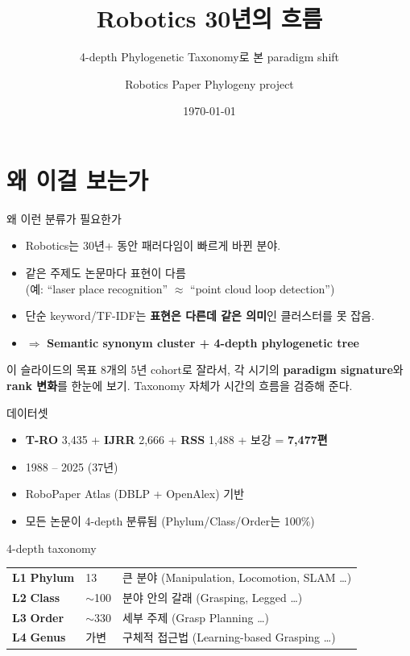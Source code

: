 \documentclass[aspectratio=169,t]{beamer}
\title[Robotics 30년]{Robotics 30년의 흐름}
\subtitle{4-depth Phylogenetic Taxonomy로 본 paradigm shift}
\author[Phylogeny]{Robotics Paper Phylogeny project}
\institute[7{,}477 papers]{T-RO · IJRR · RSS, 7,477 papers (1988--2025)}
\date{\today}
\newcommand{\hot}[1]{\textcolor{accentorange}{\textbf{#1}}}
\newcommand{\cool}[1]{\textcolor{accentblue}{\textbf{#1}}}
\newcommand{\muted}[1]{\textcolor{mutedgray}{#1}}
\begin{document}
\frame{\titlepage}

\section{왜 이걸 보는가}

\begin{frame}{왜 이런 분류가 필요한가}
\begin{itemize}
  \item Robotics는 30년+ 동안 패러다임이 빠르게 바뀐 분야.
  \item 같은 주제도 논문마다 표현이 다름 \\
        \muted{(예: ``laser place recognition'' $\approx$ ``point cloud loop detection'')}
  \item 단순 keyword/TF-IDF는 \hot{표현은 다른데 같은 의미}인 클러스터를 못 잡음.
  \item $\Rightarrow$ \cool{Semantic synonym cluster + 4-depth phylogenetic tree}
\end{itemize}
\vfill
\begin{block}{이 슬라이드의 목표}
8개의 5년 cohort로 잘라서, 각 시기의 \hot{paradigm signature}와
\hot{rank 변화}를 한눈에 보기. Taxonomy 자체가 시간의 흐름을 검증해 준다.
\end{block}
\end{frame}

\begin{frame}{데이터셋}
\begin{itemize}
  \item \cool{T-RO} 3{,}435 + \cool{IJRR} 2{,}666 + \cool{RSS} 1{,}488 + 보강 = \hot{7{,}477편}
  \item 1988 -- 2025 (37년)
  \item RoboPaper Atlas (DBLP + OpenAlex) 기반
  \item 모든 논문이 4-depth 분류됨 (Phylum/Class/Order는 100\%)
\end{itemize}
\vfill
\begin{block}{4-depth taxonomy}
\begin{tabular}{@{}lll@{}}
\textbf{L1} \textbf{Phylum} & 13   & 큰 분야 (Manipulation, Locomotion, SLAM \dots) \\
\textbf{L2} \textbf{Class}  & $\sim$100  & 분야 안의 갈래 (Grasping, Legged \dots) \\
\textbf{L3} \textbf{Order}  & $\sim$330  & 세부 주제 (Grasp Planning \dots) \\
\textbf{L4} \textbf{Genus}  & 가변 & 구체적 접근법 (Learning-based Grasping \dots) \\
\end{tabular}
\end{block}
\end{frame}
\end{document}
